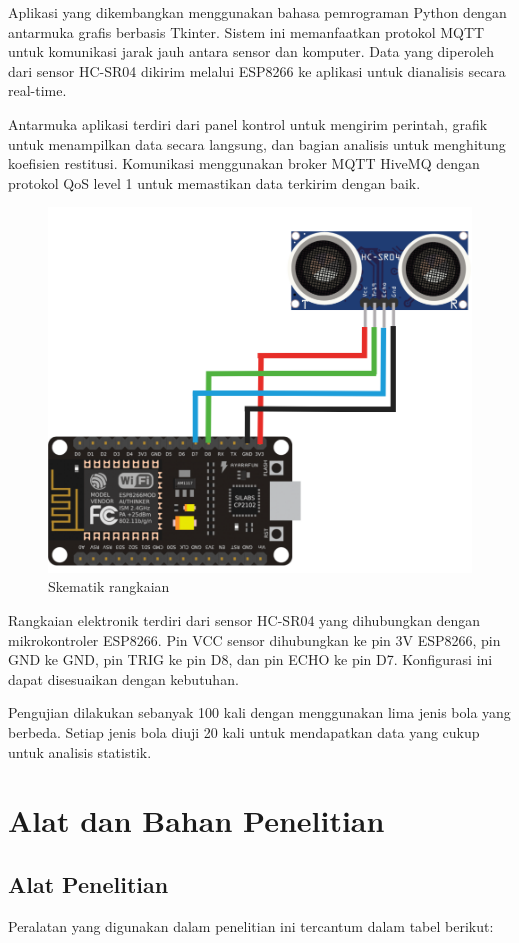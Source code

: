 Aplikasi yang dikembangkan menggunakan bahasa pemrograman Python dengan antarmuka grafis berbasis Tkinter. Sistem ini memanfaatkan protokol MQTT untuk komunikasi jarak jauh antara sensor dan komputer. Data yang diperoleh dari sensor HC-SR04 dikirim melalui ESP8266 ke aplikasi untuk dianalisis secara real-time.

Antarmuka aplikasi terdiri dari panel kontrol untuk mengirim perintah, grafik untuk menampilkan data secara langsung, dan bagian analisis untuk menghitung koefisien restitusi. Komunikasi menggunakan broker MQTT HiveMQ dengan protokol QoS level 1 untuk memastikan data terkirim dengan baik.

\begin{figure}
    \centering
    \includegraphics[width=0.5\linewidth]{images/Skematik Rangkaian.png}
    \caption{Skematik rangkaian}
    \label{fig:skematik_rangkaian}
\end{figure}

Rangkaian elektronik terdiri dari sensor HC-SR04 yang dihubungkan dengan mikrokontroler ESP8266. Pin VCC sensor dihubungkan ke pin 3V ESP8266, pin GND ke GND, pin TRIG ke pin D8, dan pin ECHO ke pin D7. Konfigurasi ini dapat disesuaikan dengan kebutuhan.

Pengujian dilakukan sebanyak 100 kali dengan menggunakan lima jenis bola yang berbeda. Setiap jenis bola diuji 20 kali untuk mendapatkan data yang cukup untuk analisis statistik.

\section{Alat dan Bahan Penelitian}

\subsection{Alat Penelitian}
Peralatan yang digunakan dalam penelitian ini tercantum dalam tabel berikut:

